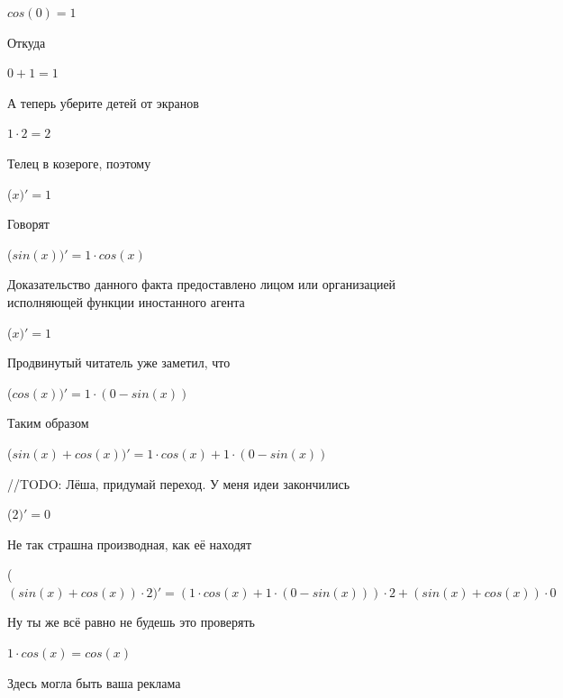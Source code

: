 \documentclass[12pt,a4paper,fleqn]{article}
\begin{document}
\begin{center}
\end{center}
\begin{center}$cos(0) = 1$\end{center}
Откуда

\begin{center}
\end{center}
\begin{center}$0+1 = 1$\end{center}
А теперь уберите детей от экранов

\begin{center}
\end{center}
\begin{center}$1 \cdot 2 = 2$\end{center}
Телец в козероге, поэтому

\begin{center}
 ($x)'
  = 1$\end{center}
Говорят

\begin{center}
 ($sin(x))'
  = 1 \cdot cos(x)$\end{center}
Доказательство данного факта предоставлено лицом или организацией исполняющей функции иностанного агента

\begin{center}
 ($x)'
  = 1$\end{center}
Продвинутый читатель уже заметил, что

\begin{center}
 ($cos(x))'
  = 1 \cdot (0-sin(x))$\end{center}
Таким образом

\begin{center}
 ($sin(x)+cos(x))'
  = 1 \cdot cos(x)+1 \cdot (0-sin(x))$\end{center}
//TODO: Лёша, придумай переход. У меня идеи закончились

\begin{center}
 ($2)'
  = 0$\end{center}
Не так страшна производная, как её находят\cite{link2}

\begin{center}
 ($(sin(x)+cos(x)) \cdot 2)'
  = (1 \cdot cos(x)+1 \cdot (0-sin(x))) \cdot 2+(sin(x)+cos(x)) \cdot 0$\end{center}
Ну ты же всё равно не будешь это проверять

\begin{center}
$1 \cdot cos(x) = cos(x)$\end{center}
Здесь могла быть ваша реклама
\end{document}
